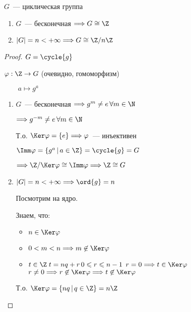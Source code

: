 \begin{theorem-non}
    $G$~--- циклическая группа 

    \begin{enumerate}
        \item $G$~--- бесконечная $\Longrightarrow G \cong \Z$
        \item $|G| = n < +\infty \Longrightarrow G \cong \Z / n \Z$
    \end{enumerate}

    \begin{proof}
        
        $G = \cycle{g}$

        $\varphi: \Z \to G$ (очевидно, гомоморфизм)

        $\quad \quad a \mapsto g^a$

        \begin{enumerate}
            \item
            $G$~--- бесконечная $\Longrightarrow g^m \neq e \, \forall m \in \N$
            
            $\Longrightarrow g^{-m} \neq e \, \forall m \in \N$

            Т.о. $\Ker \varphi = \{ e \} \Longrightarrow \varphi$~--- инъективен

            $\Imm \varphi = \{ g^a \, | \, a \in \Z \} = \cycle{g} = G$

            $\Longrightarrow \Z / \Ker \varphi \cong \Imm \varphi \Longrightarrow \Z \cong G$

            \item
            $|G| = n < +\infty \Longrightarrow \ord{g} = n$
            
            Посмотрим на ядро.

            Знаем, что:
            \begin{itemize}
                \item $n \in \Ker \varphi$
                \item $0 < m < n \Longrightarrow m \not \in \Ker \varphi$
                \item $t \in \Z \; t = nq + r \, 0 \leqslant r \leqslant n - 1$
                $r = 0 \Longrightarrow t \in \Ker \varphi$
                $r \neq 0 \Longrightarrow r \not \in \Ker \varphi \Longrightarrow t \not \in \Ker \varphi$
            \end{itemize}

            Т.о. $\Ker \varphi = \{ nq \, | \, q \in \Z \} = n \Z$


\end{enumerate}
\end{proof}
\end{theorem-non}
